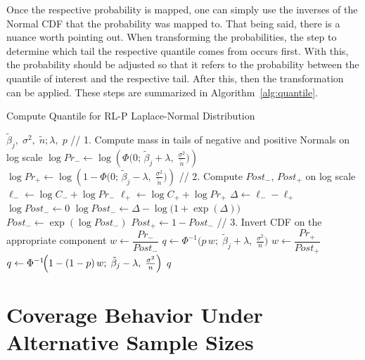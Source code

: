 Once the respective probability is mapped, one can simply use the inverses of the Normal CDF that the probability was mapped to. That being said, there is a nuance worth pointing out. When transforming the probabilities, the step to determine which tail the respective quantile comes from occurs first. With this, the probability should be adjusted so that it refers to the probability between the quantile of interest and the respective tail. After this, then the transformation can be applied. These steps are summarized in Algorithm~\ref{alg:quantile}.

\begin{algorithm}
\caption{Compute Quantile for RL-P Laplace-Normal Distribution}
\label{alg:quantile}
\begin{algorithmic}[1]
  \Require
    $\tilde{\beta}_j,\;\sigma^2,\;\tilde{n};\lambda,\;p$ 
  \Statex
  \State // 1. Compute mass in tails of negative and positive Normals on log scale
  \State $\log Pr_{-} \gets \log \left(\Phi\bigl(0;\,\tilde{\beta}_j + \lambda,\;\tfrac{\sigma^2}{\tilde{n}}\bigr)\right)$
  \State $\log Pr_{+} \gets \log \left(1 - \Phi\bigl(0;\,\tilde{\beta}_j - \lambda,\;\tfrac{\sigma^2}{\tilde{n}}\bigr)\right)$
  \Statex
  \State // 2. Compute $Post_{-},\,Post_{+}$ on log scale
  \State $\ell_{-} \gets \log C_{-} + \log Pr_{-}$
  \State $\ell_{+} \gets \log C_{+} + \log Pr_{+}$
  \State $\Delta \gets \ell_{-} - \ell_{+}$
  \If{$\exp(\Delta) = \infty$}
    \State $\log Post_{-} \gets 0$  
  \Else
    \State $\log Post_{-} \gets \Delta - \log\bigl(1 + \exp(\Delta)\bigr)$
  \EndIf
  \State $Post_{-} \gets \exp(\log Post_{-})$
  \State $Post_{+} \gets 1 - Post_{-}$
  \Statex
  \State // 3. Invert CDF on the appropriate component
    \State $w \gets \dfrac{Pr_{-}}{Post_{-}}$
    \State $q \gets \Phi^{-1}\bigl(p \,w;\;\tilde{\beta}_j + \lambda,\;\tfrac{\sigma^2}{n}\bigr)$
  \Else
    \State $w \gets \dfrac{Pr_{+}}{Post_{+}}$
    \State $q \gets \Phi^{-1}\!\Bigl(1 - (1-p)\,w;\;\tilde{\beta}_j - \lambda,\;\tfrac{\sigma^2}{n}\Bigr)$
  \EndIf
  \State \Return $q$
\end{algorithmic}
\end{algorithm}

\clearpage

\section{Coverage Behavior Under Alternative Sample Sizes}\label{Sup:alt_ns}

